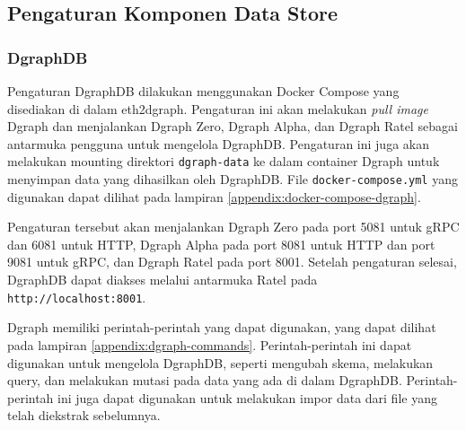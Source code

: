 \subsection{Pengaturan Komponen Data Store}

\subsubsection{DgraphDB}

Pengaturan DgraphDB dilakukan menggunakan Docker Compose yang disediakan di dalam eth2dgraph. Pengaturan ini akan melakukan \textit{pull image} Dgraph dan menjalankan Dgraph Zero, Dgraph Alpha, dan Dgraph Ratel sebagai antarmuka pengguna untuk mengelola DgraphDB. Pengaturan ini juga akan melakukan mounting direktori \texttt{dgraph-data} ke dalam container Dgraph untuk menyimpan data yang dihasilkan oleh DgraphDB. File \texttt{docker-compose.yml} yang digunakan dapat dilihat pada lampiran \ref{appendix:docker-compose-dgraph}.

Pengaturan tersebut akan menjalankan Dgraph Zero pada port 5081 untuk gRPC dan 6081 untuk HTTP, Dgraph Alpha pada port 8081 untuk HTTP dan port 9081 untuk gRPC, dan Dgraph Ratel pada port 8001. Setelah pengaturan selesai, DgraphDB dapat diakses melalui antarmuka Ratel pada \texttt{http://localhost:8001}.

Dgraph memiliki perintah-perintah yang dapat digunakan, yang dapat dilihat pada lampiran \ref{appendix:dgraph-commands}. Perintah-perintah ini dapat digunakan untuk mengelola DgraphDB, seperti mengubah skema, melakukan query, dan melakukan mutasi pada data yang ada di dalam DgraphDB. Perintah-perintah ini juga dapat digunakan untuk melakukan impor data dari file yang telah diekstrak sebelumnya.



